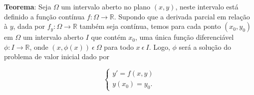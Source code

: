 \documentclass[blue]{beamer}
\numberwithin{equation}{section}
\begin{document}
%
%
%

\begin{frame}
	\justifying
\begin{flushleft}
	\justifying
	\textbf{Teorema}: Seja $\Omega$ um intervalo aberto no plano $(x,y)$, neste intervalo está definido a função contínua $f:\Omega \rightarrow \mathbb{R}$. Supondo que a derivada parcial em relação à $y$, dada por $f_y:\Omega \rightarrow \mathbb{R}$ também seja contínua, temos para cada ponto $(x_0,y_0)$ em $\Omega$ um intervalo aberto $I$ que contém $x_0$, uma única função diferenciável $\phi: I \rightarrow \mathbb{R}$, onde $(x,\phi(x)) \ \epsilon \ \Omega$ para todo $x \ \epsilon \ I$. Logo, $\phi$ será a solução do problema de valor inicial dado por
\end{flushleft}
$$\left\lbrace
\begin{array}{lcl} 
y' = f(x,y)\\
y(x_0) = y_0.
\end{array}
\right.$$
	
\end{frame}
\end{document}
